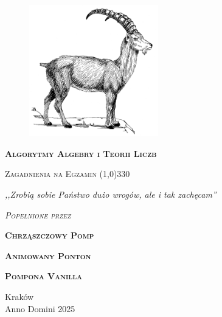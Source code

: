 \begin{titlepage}
	\begin{center}
		\begin{figure}[h]
			\centering
			\includegraphics[width=0.5\textwidth]{img/goat.png}
		\end{figure}

		\Huge
		\textbf{\textsc{Algorytmy Algebry i Teorii Liczb}}

		\vspace{0.5cm}
		\Large
		\textsc{Zagadnienia na Egzamin}
		\line(1,0){330}

		\normalsize

		\vspace{1cm}
		\textit{,,Zrobią sobie Państwo dużo wrogów, ale i tak zachęcam''}
		\vspace{1cm}

		\textit{\textsc{Popełnione przez}}\\
		\vspace{5mm}

		\textbf{\textsc{Chrząszczowy Pomp}}

		\textbf{\textsc{Animowany Ponton}}

		\textbf{\textsc{Pompona Vanilla}}

		\vfill

		Kraków \\
		Anno Domini 2025
	\end{center}
\end{titlepage}
